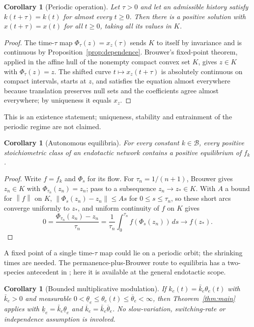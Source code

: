 \documentclass[11pt]{article}
\newtheorem{corollary}[theorem]{Corollary}
\theoremstyle{definition}
\theoremstyle{remark}
\newcommand{\B}{\mathcal B}
\newcommand{\norm}[1]{\left\|#1\right\|}
\begin{document}
\begin{corollary}[Periodic operation]\label{cor:periodic}
Let $\tau>0$ and let an admissible history satisfy $k(t+\tau)=k(t)$ for almost
every $t\ge0$. Then there is a positive solution with $x(t+\tau)=x(t)$ for all
$t\ge0$, taking all its values in $K$.
\end{corollary}
\begin{proof}
The time-$\tau$ map $\Phi_\tau(z)=x_z(\tau)$ sends $K$ to itself by invariance and
is continuous by Proposition~\ref{prop:dependence}. Brouwer's fixed-point theorem,
applied in the affine hull of the nonempty compact convex set $K$, gives
$z\in K$ with $\Phi_\tau(z)=z$. The shifted curve $t\mapsto x_z(t+\tau)$ is
absolutely continuous on compact intervals, starts at $z$, and satisfies the
equation almost everywhere because translation preserves null sets and the
coefficients agree almost everywhere; by uniqueness it equals $x_z$.
\end{proof}
This is an existence statement; uniqueness, stability and entrainment of the
periodic regime are not claimed.

\begin{corollary}[Autonomous equilibria]\label{cor:equilibrium}
For every constant $k\in\B$, every positive stoichiometric class of an endotactic
network contains a positive equilibrium of $f_k$.
\end{corollary}
\begin{proof}
Write $f=f_k$ and $\Phi_s$ for its flow. For $\tau_n=1/(n+1)$, Brouwer gives
$z_n\in K$ with $\Phi_{\tau_n}(z_n)=z_n$; pass to a subsequence $z_n\to z_*\in K$.
With $A$ a bound for $\norm f$ on $K$, $\norm{\Phi_s(z_n)-z_n}\le As$ for
$0\le s\le\tau_n$, so these short arcs converge uniformly to $z_*$, and uniform
continuity of $f$ on $K$ gives
\[
 0=\frac{\Phi_{\tau_n}(z_n)-z_n}{\tau_n}=\frac1{\tau_n}\int_0^{\tau_n}f(\Phi_s(z_n))\,ds
 \longrightarrow f(z_*).
\]
\end{proof}
A fixed point of a single time-$\tau$ map could lie on a periodic orbit; the
shrinking times are needed. The permanence-plus-Brouwer route to equilibria has a
two-species antecedent in \cite[Remark~6.2]{CraciunNazarovPantea2013}; here it is
available at the general endotactic scope.

\begin{corollary}[Bounded multiplicative modulation]\label{cor:modulation}
If $k_e(t)=\bar k_e\theta_e(t)$ with $\bar k_e>0$ and measurable
$0<\underline\theta_e\le\theta_e(t)\le\overline\theta_e<\infty$, then
Theorem~\ref{thm:main} applies with
$\underline k_e=\bar k_e\underline\theta_e$ and
$\overline k_e=\bar k_e\overline\theta_e$. No slow-variation, switching-rate or
independence assumption is involved.
\end{corollary}
\end{document}
